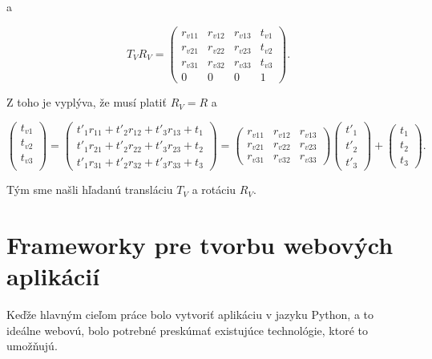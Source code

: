 a

$$
    T_V R_V =
    \begin{pmatrix}
    r_{v11} & r_{v12} & r_{v13} & t_{v1} \\
    r_{v21} & r_{v22} & r_{v23} & t_{v2} \\
    r_{v31} & r_{v32} & r_{v33} & t_{v3} \\
    0 & 0 & 0 & 1
    \end{pmatrix} \mathrm{.}
$$

Z toho je vyplýva, že musí platiť $R_V = R$ a

$$
    \begin{pmatrix}
    t_{v1} \\
    t_{v2} \\
    t_{v3} \\
    \end{pmatrix}
    =
    \begin{pmatrix}
    t'_1 r_{11} + t'_2 r_{12} + t'_3 r_{13} + t_1 \\
    t'_1 r_{21} + t'_2 r_{22} + t'_3 r_{23} + t_2 \\
    t'_1 r_{31} + t'_2 r_{32} + t'_3 r_{33} + t_3
    \end{pmatrix}
    =
    \begin{pmatrix}
    r_{v11} & r_{v12} & r_{v13} \\
    r_{v21} & r_{v22} & r_{v23} \\
    r_{v31} & r_{v32} & r_{v33}
    \end{pmatrix}
    \begin{pmatrix}
    t'_1 \\
    t'_2 \\
    t'_3
    \end{pmatrix}
    +
    \begin{pmatrix}
    t_1 \\
    t_2 \\
    t_3
    \end{pmatrix} \mathrm{.}
$$

Tým sme našli hľadanú transláciu $T_V$ a rotáciu $R_V$.

\section{Frameworky pre tvorbu webových aplikácií}

Keďže hlavným cieľom práce bolo vytvoriť aplikáciu v jazyku Python, a to ideálne webovú, bolo potrebné preskúmať existujúce technológie, ktoré to umožňujú.

